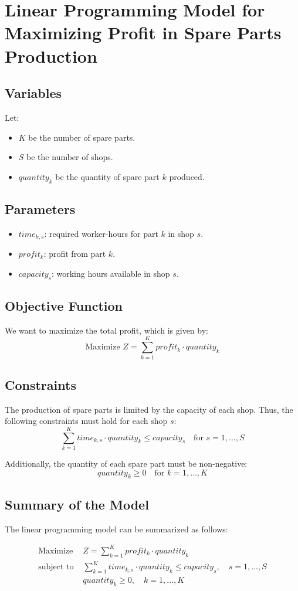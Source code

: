 \documentclass{article}
\begin{document}
\section*{Linear Programming Model for Maximizing Profit in Spare Parts Production}

\subsection*{Variables}
Let:
\begin{itemize}
    \item \( K \) be the number of spare parts.
    \item \( S \) be the number of shops.
    \item \( quantity_k \) be the quantity of spare part \( k \) produced.
\end{itemize}

\subsection*{Parameters}
\begin{itemize}
    \item \( time_{k,s} \): required worker-hours for part \( k \) in shop \( s \).
    \item \( profit_k \): profit from part \( k \).
    \item \( capacity_s \): working hours available in shop \( s \).
\end{itemize}

\subsection*{Objective Function}
We want to maximize the total profit, which is given by:
\[
\text{Maximize } Z = \sum_{k=1}^{K} profit_k \cdot quantity_k
\]

\subsection*{Constraints}
The production of spare parts is limited by the capacity of each shop. Thus, the following constraints must hold for each shop \( s \):
\[
\sum_{k=1}^{K} time_{k,s} \cdot quantity_k \leq capacity_s \quad \text{for } s = 1, \ldots, S
\]

Additionally, the quantity of each spare part must be non-negative:
\[
quantity_k \geq 0 \quad \text{for } k = 1, \ldots, K
\]

\subsection*{Summary of the Model}
The linear programming model can be summarized as follows:

\begin{align*}
\text{Maximize } & Z = \sum_{k=1}^{K} profit_k \cdot quantity_k \\
\text{subject to } & \sum_{k=1}^{K} time_{k,s} \cdot quantity_k \leq capacity_s, \quad s = 1, \ldots, S \\
& quantity_k \geq 0, \quad k = 1, \ldots, K
\end{align*}
\end{document}
